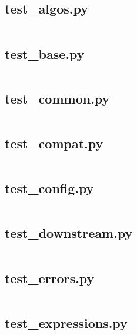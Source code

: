 \documentclass{article}
\begin{document}
\subsection{test\_algos.py}
\inputminted{python}{/home/dufferzafar/dev/@clones/pandas/pandas/tests/test_algos.py}
\newpage

\subsection{test\_base.py}
\inputminted{python}{/home/dufferzafar/dev/@clones/pandas/pandas/tests/test_base.py}
\newpage

\subsection{test\_common.py}
\inputminted{python}{/home/dufferzafar/dev/@clones/pandas/pandas/tests/test_common.py}
\newpage

\subsection{test\_compat.py}
\inputminted{python}{/home/dufferzafar/dev/@clones/pandas/pandas/tests/test_compat.py}
\newpage

\subsection{test\_config.py}
\inputminted{python}{/home/dufferzafar/dev/@clones/pandas/pandas/tests/test_config.py}
\newpage

\subsection{test\_downstream.py}
\inputminted{python}{/home/dufferzafar/dev/@clones/pandas/pandas/tests/test_downstream.py}
\newpage

\subsection{test\_errors.py}
\inputminted{python}{/home/dufferzafar/dev/@clones/pandas/pandas/tests/test_errors.py}
\newpage

\subsection{test\_expressions.py}
\inputminted{python}{/home/dufferzafar/dev/@clones/pandas/pandas/tests/test_expressions.py}
\newpage
\end{document}
